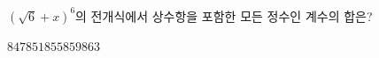 $(\sqrt{6}+x)^6$의 전개식에서 상수항을 포함한 모든 정수인 계수의 합은?
\begin{choices32}{$847$}{$851$}{$855$}{$859$}{$863$}\end{choices32}
